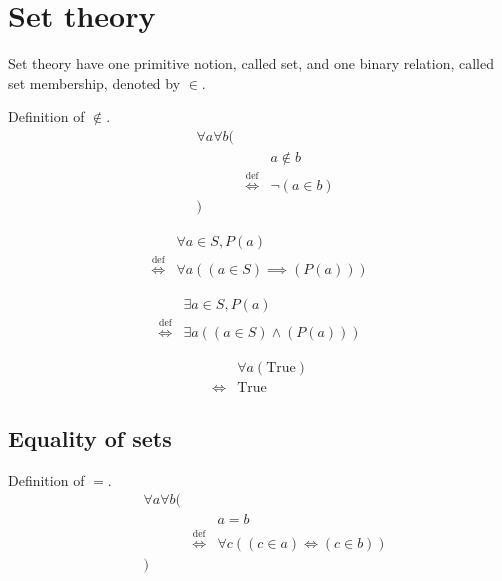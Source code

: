 \chapter{Set theory}
Set theory have one primitive notion, called set, and one binary relation, called set membership, denoted by $\in$.

\begin{defn}
\label{Definition:notin}
Definition of $\notin$.
\begin{align*}
& \forall a \forall b ( \\
& & & a \notin b \\
& & \overset{\operatorname{def}}{\iff} & \lnot (a \in b) \\
& )
\end{align*}
\end{defn}

\begin{defn}
\begin{align*}
& \forall a \in S, P(a) \\
\overset{\operatorname{def}}{\iff} & \forall a ((a \in S) \implies (P(a)))
\end{align*}
\end{defn}

\begin{defn}
\begin{align*}
& \exists a \in S, P(a) \\
\overset{\operatorname{def}}{\iff} & \exists a ((a \in S) \land (P(a)))
\end{align*}
\end{defn}

\begin{prop}
\label{Proposition:forall_true}
\begin{align*}
& \forall a (\text{True}) \\
\iff & \text{True}
\end{align*}
\end{prop}

\section{Equality of sets}
\begin{defn}
\label{Definition:equality}
Definition of $=$.
\begin{align*}
& \forall a \forall b ( \\
& & & a = b \\
& & \overset{\operatorname{def}}{\iff} & \forall c ((c \in a) \iff (c \in b)) \\
& )
\end{align*}
\end{defn}

